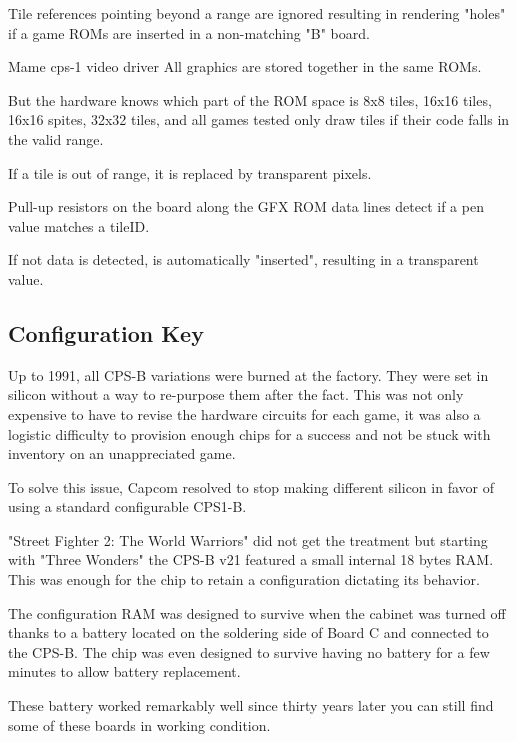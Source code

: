 Tile references pointing beyond a range are ignored resulting in rendering "holes" if a game ROMs are inserted in a non-matching "B" board.

\begin{q}{Mame cps-1 video driver}
All graphics are
stored together in the same ROMs.

But the hardware knows which part of the ROM space
is 8x8 tiles, 16x16 tiles, 16x16 spites, 32x32 tiles, and all games tested only
draw tiles if their code falls in the valid range. 

If a tile is out of range, it is replaced by transparent pixels.
\end{q}

\begin{trivia}
Pull-up resistors on the board along the GFX ROM data lines detect if a pen value matches a tileID. 

If not data is detected,  is automatically "inserted", resulting in a transparent value.
\end{trivia}



\subsection{Configuration Key}
Up to 1991, all CPS-B variations were burned at the factory. They were set in silicon without a way to re-purpose them after the fact. This was not only expensive to have to revise the hardware circuits for each game, it was also a logistic difficulty to provision enough chips for a success and not be stuck with inventory on an unappreciated game.

To solve this issue, Capcom resolved to stop making different silicon in favor of using a standard configurable CPS1-B.

"Street Fighter 2: The World Warriors" did not get the treatment but starting with "Three Wonders" the CPS-B v21 featured a small internal 18 bytes RAM. This was enough for the chip to retain a configuration dictating its behavior\cite{petitSecurity}.

The configuration RAM was designed to survive when the cabinet was turned off thanks to a battery located  on the soldering side of Board C and connected to the CPS-B. The chip was even designed to survive having no battery for a few minutes to allow battery replacement.

\begin{trivia}
These battery worked remarkably well since thirty years later you can still find some of these boards in working condition.
\end{trivia}

